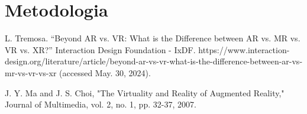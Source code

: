 \documentclass[conference]{IEEEtran}
\begin{document}
\section{Metodologia}

\begin{thebibliography}{00}
  L. Tremosa. “Beyond AR vs. VR: What is the Difference between AR vs. MR vs. VR vs. XR?” Interaction Design Foundation - IxDF. https://www.interaction-design.org/literature/article/beyond-ar-vs-vr-what-is-the-difference-between-ar-vs-mr-vs-vr-vs-xr (accessed May. 30, 2024).

  J. Y. Ma and J. S. Choi, "The Virtuality and Reality of Augmented Reality," Journal of Multimedia, vol. 2, no. 1, pp. 32-37, 2007.
\end{thebibliography}
\end{document}
